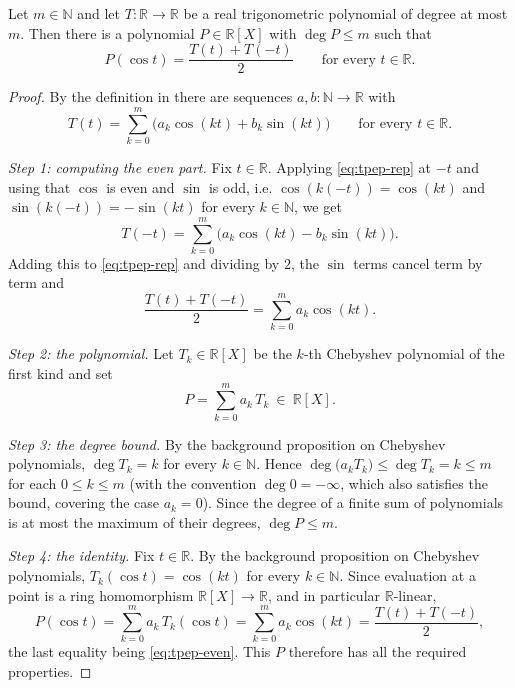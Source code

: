 \begin{lemma}
Let $m\in\mathbb{N}$ and let $T:\mathbb{R}\to\mathbb{R}$ be a real
trigonometric polynomial of degree at most $m$. Then there is a polynomial
$P\in\mathbb{R}[X]$ with $\deg P\le m$ such that
\[
  P(\cos t)=\frac{T(t)+T(-t)}{2}\qquad\text{for every }t\in\mathbb{R}.
\]
\end{lemma}
\begin{proof}
By the definition in  there are sequences
$a,b:\mathbb{N}\to\mathbb{R}$ with
\begin{equation}\label{eq:tpep-rep}
  T(t)=\sum_{k=0}^{m}\bigl(a_k\cos(kt)+b_k\sin(kt)\bigr)
  \qquad\text{for every }t\in\mathbb{R}.
\end{equation}

\emph{Step 1: computing the even part.} Fix $t\in\mathbb{R}$. Applying
\eqref{eq:tpep-rep} at $-t$ and using that $\cos$ is even and $\sin$ is odd,
i.e. $\cos(k(-t))=\cos(kt)$ and $\sin(k(-t))=-\sin(kt)$ for every
$k\in\mathbb{N}$, we get
\[
  T(-t)=\sum_{k=0}^{m}\bigl(a_k\cos(kt)-b_k\sin(kt)\bigr).
\]
Adding this to \eqref{eq:tpep-rep} and dividing by $2$, the $\sin$ terms cancel
term by term and
\begin{equation}\label{eq:tpep-even}
  \frac{T(t)+T(-t)}{2}=\sum_{k=0}^{m}a_k\cos(kt).
\end{equation}

\emph{Step 2: the polynomial.} Let $T_k\in\mathbb{R}[X]$ be the $k$-th
Chebyshev polynomial of the first kind and set
\[
  P=\sum_{k=0}^{m}a_k\,T_k\ \in\ \mathbb{R}[X].
\]

\emph{Step 3: the degree bound.} By the background proposition on Chebyshev
polynomials, $\deg T_k=k$ for every $k\in\mathbb{N}$. Hence
$\deg\bigl(a_kT_k\bigr)\le\deg T_k=k\le m$ for each $0\le k\le m$ (with the
convention $\deg 0=-\infty$, which also satisfies the bound, covering the case
$a_k=0$). Since the degree of a finite sum of polynomials is at most the maximum
of their degrees, $\deg P\le m$.

\emph{Step 4: the identity.} Fix $t\in\mathbb{R}$. By the background proposition
on Chebyshev polynomials, $T_k(\cos t)=\cos(kt)$ for every $k\in\mathbb{N}$.
Since evaluation at a point is a ring homomorphism $\mathbb{R}[X]\to\mathbb{R}$,
and in particular $\mathbb{R}$-linear,
\[
  P(\cos t)=\sum_{k=0}^{m}a_k\,T_k(\cos t)=\sum_{k=0}^{m}a_k\cos(kt)
          =\frac{T(t)+T(-t)}{2},
\]
the last equality being \eqref{eq:tpep-even}. This $P$ therefore has all the
required properties.
\end{proof}
